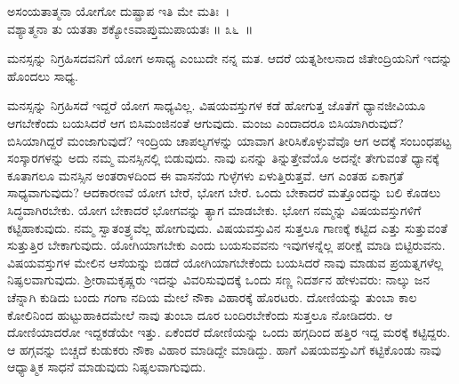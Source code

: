 \begin{shloka}
ಅಸಂಯತಾತ್ಮನಾ ಯೋಗೋ ದುಷ್ಪ್ರಾಪ ಇತಿ ಮೇ ಮತಿಃ~।\\ವಶ್ಯಾತ್ಮನಾ ತು ಯತತಾ ಶಕ್ಯೋಽವಾಪ್ತುಮುಪಾಯತಃ \hfill॥ ೩೬~॥
\end{shloka}

\begin{artha}
ಮನಸ್ಸನ್ನು ನಿಗ್ರಹಿಸದವನಿಗೆ ಯೋಗ ಅಸಾಧ್ಯ ಎಂಬುದೇ ನನ್ನ ಮತ. ಆದರೆ ಯತ್ನಶೀಲನಾದ ಜಿತೇಂದ್ರಿಯನಿಗೆ ಇದನ್ನು ಹೊಂದಲು ಸಾಧ್ಯ.
\end{artha}

ಮನಸ್ಸನ್ನು ನಿಗ್ರಹಿಸದೆ ಇದ್ದರೆ ಯೋಗ ಸಾಧ್ಯವಿಲ್ಲ. ವಿಷಯವಸ್ತುಗಳ ಕಡೆ ಹೋಗುತ್ತ ಜೊತೆಗೆ ಧ್ಯಾನಜೀವಿಯೂ ಆಗಬೇಕೆಂದು ಬಯಸಿದರೆ ಆಗ ಬಿಸಿಮಂಜಿನಂತೆ ಆಗುವುದು. ಮಂಜು ಎಂದಾದರೂ ಬಿಸಿಯಾಗಿರುವುದೆ? ಬಿಸಿಯಾಗಿದ್ದರೆ ಮಂಜಾಗುವುದೆ? ಇಂದ್ರಿಯ ಚಾಪಲ್ಯಗಳನ್ನು ಯಾವಾಗ ತೀರಿಸಿಕೊಳ್ಳುವೆವೊ ಆಗ ಅದಕ್ಕೆ ಸಂಬಂಧಪಟ್ಟ ಸಂಸ್ಕಾರಗಳನ್ನು ಅದು ನಮ್ಮ ಮನಸ್ಸಿನಲ್ಲಿ ಬಿಡುವುದು. ನಾವು ಏನನ್ನು ತಿನ್ನುತ್ತೇವೆಯೊ ಅದನ್ನೇ ತೇಗುವಂತೆ ಧ್ಯಾನಕ್ಕೆ ಕೂತಾಗಲೂ ಮನಸ್ಸಿನ ಅಂತರಾಳದಿಂದ ಈ ವಾಸನೆಯ ಗುಳ್ಳೆಗಳು ಏಳುತ್ತಿರುತ್ತವೆ. ಆಗ ಎಂತಹ ಏಕಾಗ್ರತೆ ಸಾಧ್ಯವಾಗುವುದು? ಆದಕಾರಣವೆ ಯೋಗ ಬೇರೆ, ಭೋಗ ಬೇರೆ. ಒಂದು ಬೇಕಾದರೆ ಮತ್ತೊಂದನ್ನು ಬಲಿ ಕೊಡಲು ಸಿದ್ಧವಾಗಿರಬೇಕು. ಯೋಗ ಬೇಕಾದರೆ ಭೋಗವನ್ನು ತ್ಯಾಗ ಮಾಡಬೇಕು. ಭೋಗ ನಮ್ಮನ್ನು ವಿಷಯವಸ್ತುಗಳಿಗೆ ಕಟ್ಟಿಹಾಕುವುದು. ನಮ್ಮ ಸ್ವಾತಂತ್ರ್ಯವೆಲ್ಲ ಹೋಗುವುದು. ವಿಷಯವಸ್ತುವಿನ ಸುತ್ತಲೂ ಗಾಣಕ್ಕೆ ಕಟ್ಟಿದ ಎತ್ತು ಸುತ್ತುವಂತೆ ಸುತ್ತುತ್ತಿರ ಬೇಕಾಗುವುದು. ಯೋಗಿಯಾಗಬೇಕು ಎಂದು ಬಯಸುವವನು ಇವುಗಳನ್ನೆಲ್ಲ ಪರೀಕ್ಷೆ ಮಾಡಿ ಬಿಟ್ಟಿರುವನು. ವಿಷಯವಸ್ತುಗಳ ಮೇಲಿನ ಆಸೆಯನ್ನು ಬಿಡದೆ ಯೋಗಿಯಾಗಬೇಕೆಂದು ಬಯಸಿದರೆ ನಾವು ಮಾಡುವ ಪ್ರಯತ್ನಗಳೆಲ್ಲ ನಿಷ್ಫಲವಾಗುವುದು. ಶ‍್ರೀರಾಮಕೃಷ್ಣರು ಇದನ್ನು ವಿವರಿಸುವುದಕ್ಕೆ ಒಂದು ಸಣ್ಣ ನಿದರ್ಶನ ಹೇಳುವರು: ನಾಲ್ಕು ಜನ ಚೆನ್ನಾಗಿ ಕುಡಿದು ಬಂದು ಗಂಗಾ ನದಿಯ ಮೇಲೆ ನೌಕಾ ವಿಹಾರಕ್ಕೆ ಹೊರಟರು. ದೋಣಿಯನ್ನು ತುಂಬಾ ಕಾಲ ಕೋಲಿನಿಂದ ಹುಟ್ಟುಹಾಕಿದಮೇಲೆ ನಾವು ತುಂಬಾ ದೂರ ಬಂದಿರಬೇಕೆಂದು ಸುತ್ತಲೂ ನೋಡಿದರು. ಆ ದೋಣಿಯಾದರೋ ಇದ್ದಕಡೆಯೇ ಇತ್ತು. ಏಕೆಂದರೆ ದೋಣಿಯನ್ನು ಒಂದು ಹಗ್ಗದಿಂದ ಹತ್ತಿರ ಇದ್ದ ಮರಕ್ಕೆ ಕಟ್ಟಿದ್ದರು. ಆ ಹಗ್ಗವನ್ನು ಬಿಚ್ಚದೆ ಕುಡುಕರು ನೌಕಾ ವಿಹಾರ ಮಾಡಿದ್ದೇ ಮಾಡಿದ್ದು. ಹಾಗೆ ವಿಷಯವಸ್ತುವಿಗೆ ಕಟ್ಟಿಕೊಂಡು ನಾವು ಆಧ್ಯಾತ್ಮಿಕ ಸಾಧನೆ ಮಾಡುವುದು ನಿಷ್ಫಲವಾಗುವುದು.

